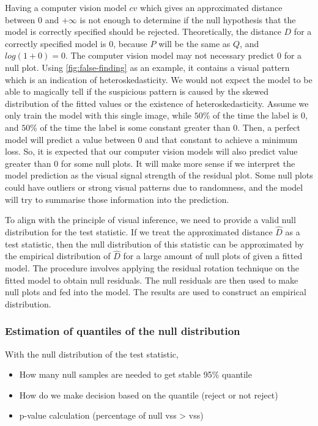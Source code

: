 \documentclass[]{interact}
\theoremstyle{plain}%
\theoremstyle{definition}
\theoremstyle{remark}
\providecommand{\tightlist}{%
  \setlength{\itemsep}{0pt}\setlength{\parskip}{0pt}}
\def\tightlist{}
\begin{document}
Having a computer vision model \(cv\) which gives an approximated
distance between \(0\) and \(+\infty\) is not enough to determine if the
null hypothesis that the model is correctly specified should be
rejected. Theoretically, the distance \(D\) for a correctly specified
model is \(0\), because \(P\) will be the same as \(Q\), and
\(log(1 + 0) = 0\). The computer vision model may not necessary predict
\(0\) for a null plot. Using \ref{fig:false-finding} as an example, it
contains a visual pattern which is an indication of heteroskedasticity.
We would not expect the model to be able to magically tell if the
suspicious pattern is caused by the skewed distribution of the fitted
values or the existence of heteroskedasticity. Assume we only train the
model with this single image, while \(50\)\% of the time the label is
\(0\), and \(50\)\% of the time the label is some constant greater than
\(0\). Then, a perfect model will predict a value between \(0\) and that
constant to achieve a minimum loss. So, it is expected that our computer
vision models will also predict value greater than \(0\) for some null
plots. It will make more sense if we interpret the model prediction as
the visual signal strength of the residual plot. Some null plots could
have outliers or strong visual patterns due to randomness, and the model
will try to summarise those information into the prediction.

To align with the principle of visual inference, we need to provide a
valid null distribution for the test statistic. If we treat the
approximated distance \(\hat{D}\) as a test statistic, then the null
distribution of this statistic can be approximated by the empirical
distribution of \(\hat{D}\) for a large amount of null plots of given a
fitted model. The procedure involves applying the residual rotation
technique \citep{buja2009statistical} on the fitted model to obtain null
residuals. The null residuals are then used to make null plots and fed
into the model. The results are used to construct an empirical
distribution.

\hypertarget{estimation-of-quantiles-of-the-null-distribution}{%
\subsubsection{Estimation of quantiles of the null
distribution}\label{estimation-of-quantiles-of-the-null-distribution}}

With the null distribution of the test statistic,

\begin{itemize}
\tightlist
\item
  How many null samples are needed to get stable 95\% quantile
\item
  How do we make decision based on the quantile (reject or not reject)
\item
  p-value calculation (percentage of null vss \textgreater{} vss)
\end{itemize}
\end{document}
